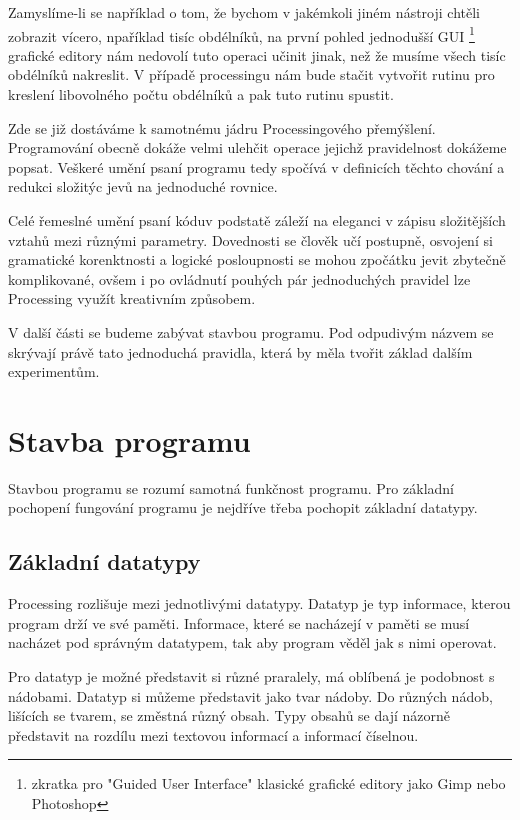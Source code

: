 \documentclass[11pt]{article}
\begin{document}
Zamyslíme-li se například o tom, že bychom v jakémkoli jiném nástroji chtěli zobrazit vícero, npaříklad tisíc obdélníků, na první pohled jednodušší GUI \footnote{zkratka pro "Guided User Interface" klasické grafické editory jako Gimp nebo Photoshop} grafické editory nám nedovolí tuto operaci učinit jinak, než že musíme všech tisíc obdélníků nakreslit. V případě processingu nám bude stačit vytvořit rutinu pro kreslení libovolného počtu obdélníků a pak tuto rutinu spustit.

Zde se již dostáváme k samotnému jádru Processingového přemýšlení. Programování obecně dokáže velmi ulehčit operace jejichž pravidelnost dokážeme popsat. Veškeré umění psaní programu tedy spočívá v definicích těchto chování a redukci složitýc jevů na jednoduché rovnice.

Celé řemeslné umění psaní kóduv podstatě záleží na eleganci v zápisu složitějších vztahů mezi různými parametry. Dovednosti se člověk učí postupně, osvojení si gramatické korenktnosti a logické posloupnosti se mohou zpočátku jevit zbytečně komplikované, ovšem i po ovládnutí pouhých pár jednoduchých pravidel lze Processing využít kreativním způsobem.

V další části se budeme zabývat stavbou programu. Pod odpudivým názvem se skrývají právě tato jednoduchá pravidla, která by měla tvořit základ dalším experimentům.   

\newpage
\section{Stavba programu}


Stavbou programu se rozumí samotná funkčnost programu. Pro základní pochopení fungování programu je nejdříve třeba pochopit základní datatypy.

\subsection{Základní datatypy}

Processing rozlišuje mezi jednotlivými datatypy. Datatyp je typ informace, kterou program drží ve své paměti. Informace, které se nacházejí v paměti se musí nacházet pod správným datatypem, tak aby program věděl jak s nimi operovat.

Pro datatyp je možné představit si různé praralely, má oblíbená je podobnost s nádobami. Datatyp si můžeme představit jako tvar nádoby. Do různých nádob, lišících se tvarem, se změstná různý obsah. Typy obsahů se dají názorně představit na rozdílu mezi textovou informací a informací číselnou.
\end{document}
